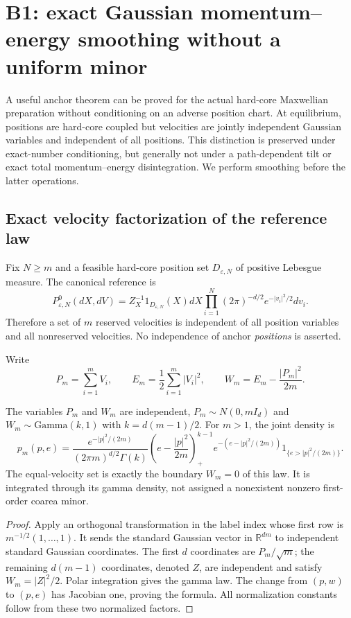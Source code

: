 \section{B1: exact Gaussian momentum--energy smoothing without a uniform minor}
\label{sec:r33-b1}

A useful anchor theorem can be proved for the actual hard-core Maxwellian preparation without conditioning on an adverse position chart. At equilibrium, positions are hard-core coupled but velocities are jointly independent Gaussian variables and independent of all positions. This distinction is preserved under exact-number conditioning, but generally not under a path-dependent tilt or exact total momentum--energy disintegration. We perform smoothing before the latter operations.

\subsection{Exact velocity factorization of the reference law}
Fix $N\ge m$ and a feasible hard-core position set $D_{\varepsilon,N}$ of positive Lebesgue measure. The canonical reference is
\[
 P^0_{\varepsilon,N}(dX,dV)=Z_X^{-1}1_{D_{\varepsilon,N}}(X)dX
               \prod_{i=1}^N(2\pi)^{-d/2}e^{-|v_i|^2/2}dv_i.
\]
Therefore a set of $m$ reserved velocities is independent of all position variables and all nonreserved velocities. No independence of anchor \emph{positions} is asserted.

Write
\[
 P_m=\sum_{i=1}^mV_i,\qquad E_m=\frac12\sum_{i=1}^m|V_i|^2,
 \qquad W_m=E_m-\frac{|P_m|^2}{2m}.
\]

\begin{theorem}
\label{thm:r33-b1-density}
The variables $P_m$ and $W_m$ are independent, $P_m\sim N(0,mI_d)$ and
$W_m\sim\mathrm{Gamma}(k,1)$ with $k=d(m-1)/2$. For $m>1$, the joint density is
\[
 p_m(p,e)=\frac{e^{-|p|^2/(2m)}}{(2\pi m)^{d/2}\Gamma(k)}
       \left(e-\frac{|p|^2}{2m}\right)_+^{k-1}
       e^{-(e-|p|^2/(2m))}
       1_{\{e>|p|^2/(2m)\}}.
\]
The equal-velocity set is exactly the boundary $W_m=0$ of this law. It is integrated through its gamma density, not assigned a nonexistent nonzero first-order coarea minor.
\end{theorem}

\begin{proof}
Apply an orthogonal transformation in the label index whose first row is $m^{-1/2}(1,\ldots,1)$. It sends the standard Gaussian vector in $\mathbb R^{dm}$ to independent standard Gaussian coordinates. The first $d$ coordinates are $P_m/\sqrt m$; the remaining $d(m-1)$ coordinates, denoted $Z$, are independent and satisfy $W_m=|Z|^2/2$. Polar integration gives the gamma law. The change from $(p,w)$ to $(p,e)$ has Jacobian one, proving the formula. All normalization constants follow from these two normalized factors.
\end{proof}

